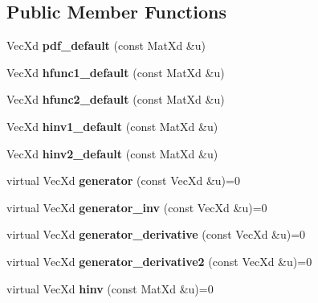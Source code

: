 \subsection*{Public Member Functions}
\begin{DoxyCompactItemize}
\item 
\mbox{\label{class_archimedean_bicop_adee082ce9b2f7cc4a3408d67ed6b49f5}} 
Vec\+Xd {\bfseries pdf\+\_\+default} (const Mat\+Xd \&u)
\item 
\mbox{\label{class_archimedean_bicop_a912effaac24a1c94aa1e1d4b08819d75}} 
Vec\+Xd {\bfseries hfunc1\+\_\+default} (const Mat\+Xd \&u)
\item 
\mbox{\label{class_archimedean_bicop_a1651e16c4534ca99cd58eaf8602b8525}} 
Vec\+Xd {\bfseries hfunc2\+\_\+default} (const Mat\+Xd \&u)
\item 
\mbox{\label{class_archimedean_bicop_a5c5a8569bad4be9e92ccd4434305806b}} 
Vec\+Xd {\bfseries hinv1\+\_\+default} (const Mat\+Xd \&u)
\item 
\mbox{\label{class_archimedean_bicop_a6bac4cee0e824719b107477a06caf19e}} 
Vec\+Xd {\bfseries hinv2\+\_\+default} (const Mat\+Xd \&u)
\item 
\mbox{\label{class_archimedean_bicop_a9b79997308dc154a23808b84a863c563}} 
virtual Vec\+Xd {\bfseries generator} (const Vec\+Xd \&u)=0
\item 
\mbox{\label{class_archimedean_bicop_af12082f1046554e0121b2c7d93148f13}} 
virtual Vec\+Xd {\bfseries generator\+\_\+inv} (const Vec\+Xd \&u)=0
\item 
\mbox{\label{class_archimedean_bicop_a9a18bbc021eb033c5b7d992d6d572b9b}} 
virtual Vec\+Xd {\bfseries generator\+\_\+derivative} (const Vec\+Xd \&u)=0
\item 
\mbox{\label{class_archimedean_bicop_a16d7c2474e7e9bd16fa60a02550762ed}} 
virtual Vec\+Xd {\bfseries generator\+\_\+derivative2} (const Vec\+Xd \&u)=0
\item 
\mbox{\label{class_archimedean_bicop_ad9f6cd9ae6ca06f0d2edea2a52f195c9}} 
virtual Vec\+Xd {\bfseries hinv} (const Mat\+Xd \&u)=0
\end{DoxyCompactItemize}
